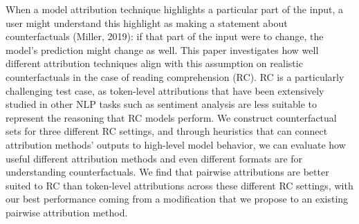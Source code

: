 When a model attribution technique highlights a particular part of the input, a user might understand this highlight as making a statement about counterfactuals (Miller, 2019): if that part of the input were to change, the model's prediction might change as well. This paper investigates how well different attribution techniques align with this assumption on realistic counterfactuals in the case of reading comprehension (RC). RC is a particularly challenging test case, as token-level attributions that have been extensively studied in other NLP tasks such as sentiment analysis are less suitable to represent the reasoning that RC models perform. We construct counterfactual sets for three different RC settings, and through heuristics that can connect attribution methods' outputs to high-level model behavior, we can evaluate how useful different attribution methods and even different formats are for understanding counterfactuals. We find that pairwise attributions are better suited to RC than token-level attributions across these different RC settings, with our best performance coming from a modification that we propose to an existing pairwise attribution method.
